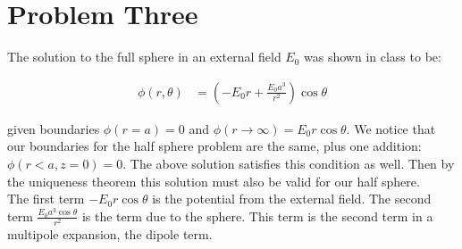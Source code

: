 \documentclass[10pt]{article} %
\begin{document}
\section{Problem Three}
The solution to the full sphere in an external field $E_0$ was shown in class to be:

\begin{align*}
  \phi(r,\theta) &= \left(-E_0r + \frac{E_0a^3}{r^2}\right)\cos\theta
\end{align*}

given boundaries $\phi(r=a) = 0$ and $\phi(r\rightarrow\infty) = E_0r\cos\theta$. We notice that our boundaries for the half sphere problem are the same, plus one addition: $\phi(r<a, z=0) = 0$. The above solution satisfies this condition as well. Then by the uniqueness theorem this solution must also be valid for our half sphere.\\

The first term $-E_0r\cos\theta$ is the potential from the external field. The second term $\frac{E_0a^3\cos\theta}{r^2}$ is the term due
to the sphere. This term is the second term in a multipole expansion, the dipole term.\\
\end{document}
